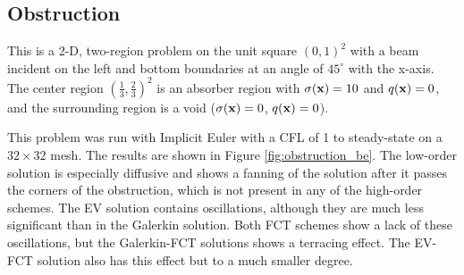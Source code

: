 \subsection{Obstruction}
This is a 2-D, two-region problem on the unit square $(0,1)^2$ with a beam incident on the
left and bottom boundaries at an angle of $45^\circ$ with the x-axis. The
center region $(\frac{1}{3},\frac{2}{3})^2$ is an absorber region
with $\sigma(\mathbf{x})=10$ and $q(\mathbf{x})=0$, and the surrounding region is a void
($\sigma(\mathbf{x})=0$, $q(\mathbf{x})=0$).

This problem was run with Implicit Euler with a CFL of 1 to steady-state on
a $32\times32$ mesh. The results are shown in Figure \ref{fig:obstruction_be}.
The low-order solution is especially diffusive and shows a fanning
of the solution after it passes the corners of the obstruction, which is
not present in any of the high-order schemes. The EV solution contains
oscillations, although they are much less significant than in the Galerkin
solution. Both FCT schemes show a lack of these oscillations, but the
Galerkin-FCT solutions shows a terracing effect. The EV-FCT solution also
has this effect but to a much smaller degree.

